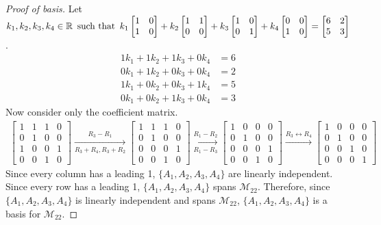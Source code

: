 \documentclass{article}
\begin{document}
\begin{proof}[Proof of basis]
  Let $k_1,k_2,k_3,k_4 \in \mathbb{R} \operatorname{~\text{such that}~} k_1\begin{bmatrix} 1 & 0 \\ 1 & 0 \end{bmatrix} + k_2\begin{bmatrix} 1 & 1 \\ 0 & 0 \end{bmatrix} + k_3\begin{bmatrix} 1 & 0 \\ 0 & 1 \end{bmatrix} + k_4\begin{bmatrix}0 & 0 \\ 1 & 0 \end{bmatrix} = \begin{bmatrix} 6 & 2 \\ 5 & 3 \end{bmatrix}$.
  \begin{align*}
    1k_1 + 1k_2 + 1k_3 + 0k_4 & = 6 \\
    0k_1 + 1k_2 + 0k_3 + 0k_4 & = 2 \\
    1k_1 + 0k_2 + 0k_3 + 1k_4 & = 5 \\
    0k_1 + 0k_2 + 1k_3 + 0k_4 & = 3
  \end{align*}
  Now consider only the coefficient matrix.
  \begin{align*}
    \begin{bmatrix}
      1 & 1 & 1 & 0 \\
      0 & 1 & 0 & 0 \\
      1 & 0 & 0 & 1 \\
      0 & 0 & 1 & 0
    \end{bmatrix} \xrightarrow[R_3 + R_4,R_3 + R_2]{R_3 - R_1}
    \begin{bmatrix}
      1 & 1 & 1 & 0 \\
      0 & 1 & 0 & 0 \\
      0 & 0 & 0 & 1 \\
      0 & 0 & 1 & 0
    \end{bmatrix} \xrightarrow[R_1 - R_3]{R_1 - R_2}
    \begin{bmatrix}
      1 & 0 & 0 & 0 \\
      0 & 1 & 0 & 0 \\
      0 & 0 & 0 & 1 \\
      0 & 0 & 1 & 0
    \end{bmatrix} \xrightarrow{R_3 \leftrightarrow R_4}
    \begin{bmatrix}
      1 & 0 & 0 & 0 \\
      0 & 1 & 0 & 0 \\
      0 & 0 & 1 & 0 \\
      0 & 0 & 0 & 1
    \end{bmatrix}
  \end{align*}
  Since every column has a leading 1, $\{A_1,A_2,A_3,A_4\}$ are linearly independent. Since every row has a leading 1, $\{A_1,A_2,A_3,A_4\}$ spans $\mathcal{M}_{22}$. Therefore, since $\{A_1,A_2,A_3,A_4\}$ is linearly independent and spans $\mathcal{M}_{22}$, $\{A_1,A_2,A_3,A_4\}$ is a basis for $\mathcal{M}_{22}$.
\end{proof}
\end{document}
